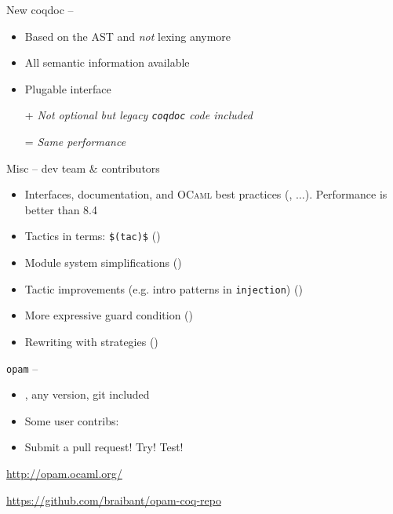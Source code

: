 \begin{subsecframe}{New coqdoc -- }
  \begin{itemize}
  \item Based on the AST and \alert{\emph{not}} lexing anymore
  \item All semantic information available
  \item Plugable interface
  \end{itemize}

  \begin{itemize}
  \item[+] \emph{Not optional but legacy \texttt{coqdoc} code included}
  \item[=] \emph{Same performance}
  \end{itemize}
  
\end{subsecframe}

\begin{subsecframefragile}{Misc -- \Coq dev team \& contributors}
  \begin{itemize}
  \item Interfaces, documentation, and \textsc{OCaml} best practices
    (, $\ldots$). \alert{Performance is better than 8.4}
  \item Tactics in terms: \verb|$(tac)$| ()
  \item Module system simplifications ()
  \item Tactic improvements (e.g. intro patterns in \texttt{injection})
    ()
  \item More expressive guard condition ()
  \item Rewriting with strategies ()
  \end{itemize}

\end{subsecframefragile}

\begin{subsecframe}{\texttt{opam} -- }
  
  \begin{itemize}
  \item {}, any version, git included
  \item Some user contribs: 
  \item Submit a pull request! Try! Test!
  \end{itemize}

  \begin{center}
    \url{http://opam.ocaml.org/}
    \vspace{0.5em}

    \url{https://github.com/braibant/opam-coq-repo}
  \end{center}
\end{subsecframe}

